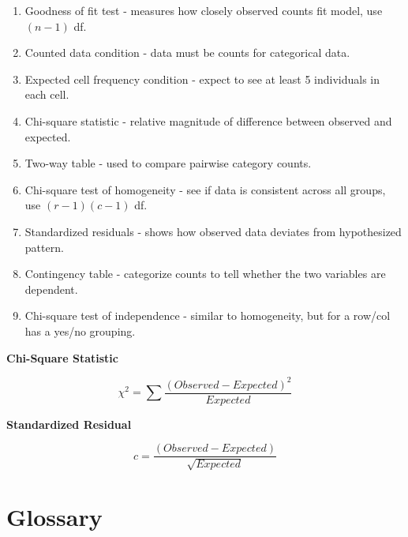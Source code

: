 \documentclass{article}
\theoremstyle{definition}
\begin{document}
\begin{enumerate}[label=\textbf{\roman*.}]
    \item Goodness of fit test - measures how closely observed counts fit model, use $(n-1)$ df.

    \item Counted data condition - data must be counts for categorical data.

    \item Expected cell frequency condition - expect to see at least 5 individuals in each cell.

    \item Chi-square statistic - relative magnitude of difference between observed and expected.

    \item Two-way table - used to compare pairwise category counts.

    \item Chi-square test of homogeneity - see if data is consistent across all groups, use $(r-1)(c-1)$ df.

    \item Standardized residuals - shows how observed data deviates from hypothesized pattern.

    \item Contingency table - categorize counts to tell whether the two variables are dependent.

    \item Chi-square test of independence - similar to homogeneity, but for a row/col has a yes/no grouping.

\end{enumerate}

\vspace{2ex}
\textbf{Chi-Square Statistic}

\begin{equation}
    \chi^2 = \sum \frac{(Observed - Expected)^2}{Expected}
\end{equation}

\vspace{2ex}
\textbf{Standardized Residual}

\begin{equation}
    c = \frac{(Observed - Expected)}{\sqrt{Expected}}
\end{equation}

\pagebreak

\section{Glossary}
\end{document}
